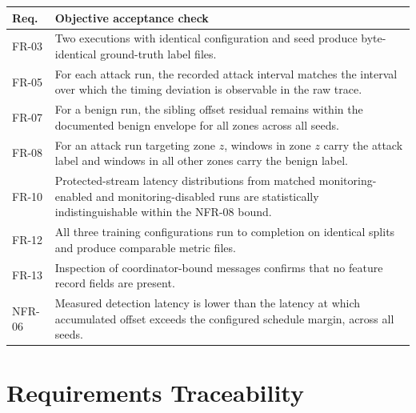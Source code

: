 \begin{longtable}{p{} p{}}
\toprule
\textbf{Req.} & \textbf{Objective acceptance check} \\
\midrule
\endhead
FR-03 & Two executions with identical configuration and seed produce byte-identical
ground-truth label files. \\
FR-05 & For each attack run, the recorded attack interval matches the interval over
which the timing deviation is observable in the raw trace. \\
FR-07 & For a benign run, the sibling offset residual remains within the documented
benign envelope for all zones across all seeds. \\
FR-08 & For an attack run targeting zone $z$, windows in zone $z$ carry the attack
label and windows in all other zones carry the benign label. \\
FR-10 & Protected-stream latency distributions from matched monitoring-enabled and
monitoring-disabled runs are statistically indistinguishable within the NFR-08 bound. \\
FR-12 & All three training configurations run to completion on identical splits and
produce comparable metric files. \\
FR-13 & Inspection of coordinator-bound messages confirms that no feature record
fields are present. \\
NFR-06 & Measured detection latency is lower than the latency at which accumulated
offset exceeds the configured schedule margin, across all seeds. \\
\bottomrule
\end{longtable}

\section{Requirements Traceability}

